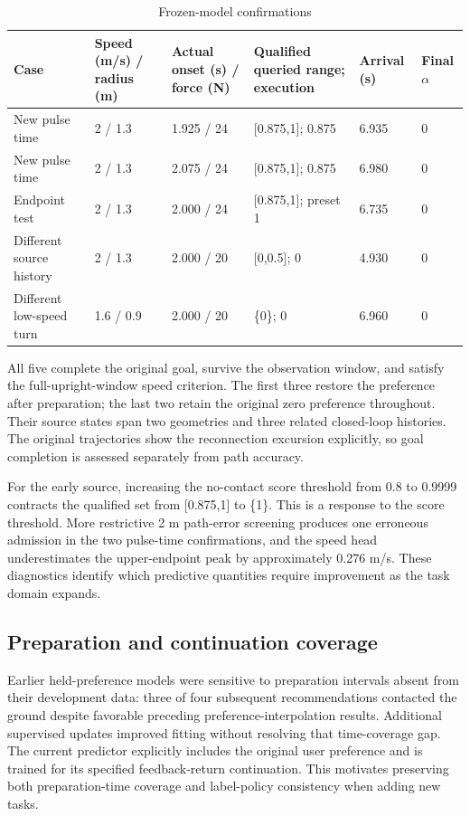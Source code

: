 \documentclass[journal]{IEEEtran}
\begin{document}
\begin{table}[tp]
\caption{Frozen-model confirmations}
\centering
\begin{tabular}{p{}p{}p{}p{}p{}p{}}
\hline
Case & Speed (m/s) / radius (m) & Actual onset (s) / force (N) & Qualified queried range; execution & Arrival (s) & Final $\alpha$ \\
\hline
New pulse time & 2 / 1.3 & 1.925 / 24 & [0.875,1]; 0.875 & 6.935 & 0 \\
\hline
New pulse time & 2 / 1.3 & 2.075 / 24 & [0.875,1]; 0.875 & 6.980 & 0 \\
\hline
Endpoint test & 2 / 1.3 & 2.000 / 24 & [0.875,1]; preset 1 & 6.735 & 0 \\
\hline
Different source history & 2 / 1.3 & 2.000 / 20 & [0,0.5]; 0 & 4.930 & 0 \\
\hline
Different low-speed turn & 1.6 / 0.9 & 2.000 / 20 & \{0\}; 0 & 6.960 & 0 \\
\hline
\end{tabular}
\end{table}
All five complete the original goal, survive the observation window, and satisfy the full-upright-window speed criterion. The first three restore the preference after preparation; the last two retain the original zero preference throughout. Their source states span two geometries and three related closed-loop histories. The original trajectories show the reconnection excursion explicitly, so goal completion is assessed separately from path accuracy.


For the early source, increasing the no-contact score threshold from 0.8 to 0.9999 contracts the qualified set from [0.875,1] to \{1\}. This is a response to the score threshold. More restrictive 2 m path-error screening produces one erroneous admission in the two pulse-time confirmations, and the speed head underestimates the upper-endpoint peak by approximately 0.276 m/s. These diagnostics identify which predictive quantities require improvement as the task domain expands.


\subsection{Preparation and continuation coverage}

Earlier held-preference models were sensitive to preparation intervals absent from their development data: three of four subsequent recommendations contacted the ground despite favorable preceding preference-interpolation results. Additional supervised updates improved fitting without resolving that time-coverage gap. The current predictor explicitly includes the original user preference and is trained for its specified feedback-return continuation. This motivates preserving both preparation-time coverage and label-policy consistency when adding new tasks.
\end{document}
